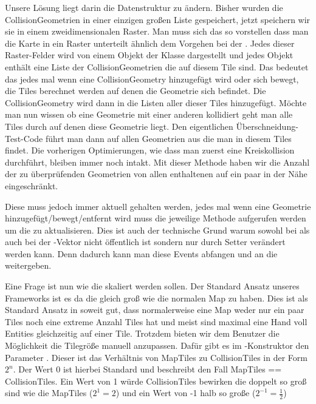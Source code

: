Unsere Lösung liegt darin die Datenstruktur zu ändern. Bisher wurden die CollisionGeometrien in einer einzigen großen Liste gespeichert, jetzt speichern wir sie in einem zweidimensionalen Raster.
Man muss sich das so vorstellen dass man die Karte in ein Raster unterteilt ähnlich dem Vorgehen bei der . Jedes dieser Raster-Felder wird von einem Objekt der Klasse  dargestellt und jedes Objekt enthält eine Liste der CollisionGeometrien die auf diesem Tile sind.
Das bedeutet das jedes mal wenn eine CollisionGeometry hinzugefügt wird oder sich bewegt, die Tiles berechnet werden auf denen die Geometrie sich befindet. Die CollisionGeometry wird dann in die Listen aller dieser Tiles hinzugefügt. Möchte man nun wissen ob eine Geometrie mit einer anderen kollidiert geht man alle Tiles durch auf denen diese Geometrie liegt. Den eigentlichen Überschneidung-Test-Code führt man dann auf allen Geometrien aus die man in diesem Tiles findet. Die vorherigen Optimierungen, wie dass man zuerst eine Kreiskollision durchführt, bleiben immer noch intakt. Mit dieser Methode haben wir die Anzahl der zu überprüfenden Geometrien von allen enthaltenen auf ein paar in der Nähe eingeschränkt.

Diese  muss jedoch immer aktuell gehalten werden, jedes mal wenn eine Geometrie hinzugefügt/bewegt/entfernt wird muss die jeweilige Methode aufgerufen werden um die  zu aktualisieren. Dies ist auch der technische Grund warum sowohl bei  als auch bei  der -Vektor nicht öffentlich ist sondern nur durch Setter verändert werden kann. Denn dadurch kann man diese Events abfangen und an die  weitergeben.

Eine Frage ist nun wie die  skaliert werden sollen. Der Standard Ansatz unseres Frameworks ist es da die  gleich groß wie die normalen Map  zu haben.
Dies ist als Standard Ansatz in soweit gut, dass normalerweise eine Map weder nur ein paar Tiles noch eine extreme Anzahl Tiles hat und meist sind maximal eine Hand voll Entities gleichzeitig auf einer Tile.
Trotzdem bieten wir dem Benutzer die Möglichkeit die Tilegröße manuell anzupassen.
Dafür gibt es im -Konstruktor den Parameter .
Dieser ist das Verhältnis von MapTiles zu CollisionTiles in der Form $ 2^n $.
Der Wert 0 ist hierbei Standard und beschreibt den Fall MapTiles == CollisionTiles.
Ein Wert von 1 würde CollisionTiles bewirken die doppelt so groß sind wie die MapTiles ($2^1 = 2$) und ein Wert von -1 halb so große ($2^{-1} = \frac{1}{2}$)

